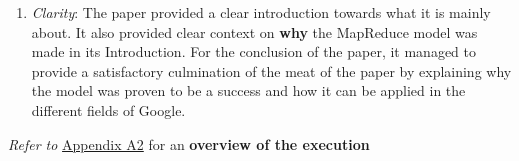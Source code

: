 \begin{enumerate}
\begin{itemize}
        \item Data‐locality optimizations to reduce network bottlenecks,
        \item And ease‐of‐use for programmers without extensive parallel or distributed computing expertise.
    \end{itemize}
    The paper also demonstrates real‐world impact at Google, reporting that hundreds of MapReduce programs are routinely run on thousands of machines. 
    \item \textit{Clarity}: The paper provided a clear introduction towards what it is mainly about. It also provided clear context on \textbf{why} the MapReduce model was made in its Introduction. For the conclusion of the paper, it managed to provide a satisfactory culmination of the meat of the paper by explaining why the model was proven to be a success and how it can be applied in the different fields of Google.
\end{enumerate}

    \textit{Refer to} \hyperref[fig2]{Appendix A2} for an \textbf{overview of the execution}


